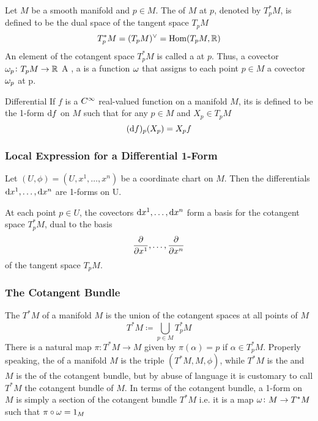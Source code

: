 Let \(M\) be a smooth manifold and \(p \in M\).
The  of \(M\) at \(p\), denoted by \(T_p^* M\), is defined to be the dual space of the tangent space \(T_p M\)
\[
    T_p^* M = (T_p M)^{\vee} = \operatorname{Hom}(T_p M, \mathbb{R})   
\]
An element of the cotangent space \(T_p^* M\) is called a  at \(p\).
Thus, a covector \(\omega_p \colon T_p M \rightarrow \mathbb{R}\)
A , a  is a function \(\omega\) that assigns to each point \(p \in M\) a covector \(\omega_p\) at p.

\begin{definition}{Differential}{}
    If \(f\) is a \(C^\infty\) real-valued function on a manifold \(M\), its  is defined to be the 1-form \(\dif f\) on \(M\) such that for any \(p \in M\) and \(X_p \in T_p M\)
    \[
        (\dif f)_p (X_p) = X_p f
    \]  
\end{definition}

\subsubsection{Local Expression for a Differential 1-Form}

Let \((U, \phi) = (U, x^1, \dots, x^n)\) be a coordinate chart on \(M\).
Then the differentials \(\dif x^1, \dots, \dif x^n\) are 1-forms on U.

\begin{proposition}{}{}
    At each point \(p \in U\), the covectors \(\dif x^1, \dots, \dif x^n\) form a basis for the cotangent space \(T_p^* M\), dual to the basis 
    \[
        \pdv{x^1}, \dots, \pdv{x^n}    
    \]
    of the tangent space \(T_p M\).
\end{proposition}

\subsubsection{The Cotangent Bundle}

The  \(T^* M\) of a manifold \(M\) is the union of the cotangent spaces at all points of \(M\)
\[
    T^* M \coloneqq \bigcup_{p \in M} T_p^* M
\]
There is a natural map \(\pi \colon T^* M \rightarrow M\) given by \(\pi(\alpha) = p\) if \(\alpha \in T_p^* M\).
Properly speaking, the  of a manifold \(M\) is the triple \((T^* M, M, \phi)\), while \(T^* M\) is the  and \(M\) is the  of the cotangent bundle, but by abuse of language it is customary to call \(T^* M\) the cotangent bundle of \(M\).
In terms of the cotangent bundle, a 1-form on \(M\) is simply a section of the cotangent bundle \(T^* M\) i.e. it is a map \(\omega \colon M \rightarrow T^*M\) such that \(\pi \circ \omega = 1_M\)


